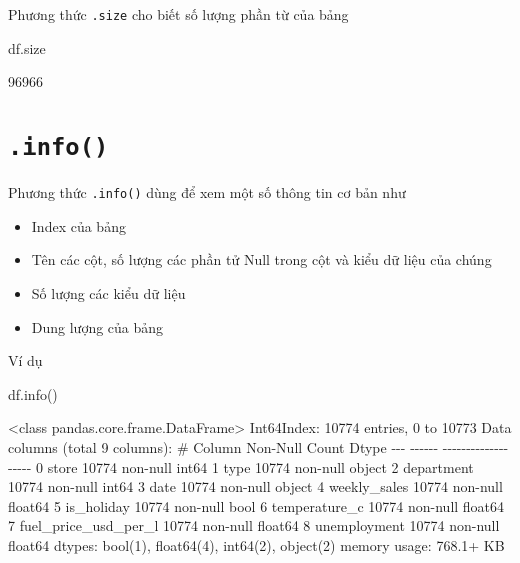 \documentclass[
]{book}
\newenvironment{Shaded}{\begin{snugshade}}{\end{snugshade}}
\newcommand{\NormalTok}[1]{#1}
\providecommand{\tightlist}{%
  \setlength{\itemsep}{0pt}\setlength{\parskip}{0pt}}
\begin{document}
Phương thức \texttt{.size} cho biết số lượng phần từ của bảng

\begin{Shaded}
\begin{Highlighting}[]
\NormalTok{df.size}
\end{Highlighting}
\end{Shaded}

\begin{Shaded}
\begin{Highlighting}[]
\NormalTok{96966}
\end{Highlighting}
\end{Shaded}

\section{\texorpdfstring{\texttt{.info()}}{.info()}}\label{info}

Phương thức \texttt{.info()} dùng để xem một số thông tin cơ bản như

\begin{itemize}
\tightlist
\item
  Index của bảng
\item
  Tên các cột, số lượng các phần tử Null trong cột và kiểu dữ liệu của chúng
\item
  Số lượng các kiểu dữ liệu
\item
  Dung lượng của bảng
\end{itemize}

Ví dụ

\begin{Shaded}
\begin{Highlighting}[]
\NormalTok{df.info()}
\end{Highlighting}
\end{Shaded}

\begin{Shaded}
\begin{Highlighting}[]
\NormalTok{\textless{}class \textquotesingle{}pandas.core.frame.DataFrame\textquotesingle{}\textgreater{}}
\NormalTok{Int64Index: 10774 entries, 0 to 10773}
\NormalTok{Data columns (total 9 columns):}
\NormalTok{ \#   Column                Non{-}Null Count  Dtype  }
\NormalTok{{-}{-}{-}  {-}{-}{-}{-}{-}{-}                {-}{-}{-}{-}{-}{-}{-}{-}{-}{-}{-}{-}{-}{-}  {-}{-}{-}{-}{-}  }
\NormalTok{ 0   store                 10774 non{-}null  int64  }
\NormalTok{ 1   type                  10774 non{-}null  object }
\NormalTok{ 2   department            10774 non{-}null  int64  }
\NormalTok{ 3   date                  10774 non{-}null  object }
\NormalTok{ 4   weekly\_sales          10774 non{-}null  float64}
\NormalTok{ 5   is\_holiday            10774 non{-}null  bool   }
\NormalTok{ 6   temperature\_c         10774 non{-}null  float64}
\NormalTok{ 7   fuel\_price\_usd\_per\_l  10774 non{-}null  float64}
\NormalTok{ 8   unemployment          10774 non{-}null  float64}
\NormalTok{dtypes: bool(1), float64(4), int64(2), object(2)}
\NormalTok{memory usage: 768.1+ KB}
\end{Highlighting}
\end{Shaded}
\end{document}
